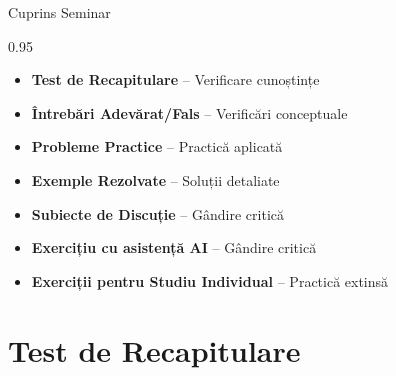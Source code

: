 \documentclass[9pt, aspectratio=169, t]{beamer}
\subtitle{Seminar 7: Cointegrare \& VECM}
\begin{document}
{
\begin{frame}
    \titlepage
\end{frame}
}

\begin{frame}{Cuprins Seminar}
    \begin{cminipage}{0.95\textwidth}
    \begin{itemize}\setlength{\itemsep}{0pt}
        \item \textbf{Test de Recapitulare} -- Verificare cunoștințe
        \vspace{0.15cm}
        \item \textbf{Întrebări Adevărat/Fals} -- Verificări conceptuale
        \vspace{0.15cm}
        \item \textbf{Probleme Practice} -- Practică aplicată
        \vspace{0.15cm}
        \item \textbf{Exemple Rezolvate} -- Soluții detaliate
        \vspace{0.15cm}
        \item \textbf{Subiecte de Discuție} -- Gândire critică
        \vspace{0.15cm}
        \item \textbf{Exercițiu cu asistență AI} -- Gândire critică
        \vspace{0.15cm}
        \item \textbf{Exerciții pentru Studiu Individual} -- Practică extinsă
    \end{itemize}
    \end{cminipage}
\end{frame}


\section{Test de Recapitulare}
\end{document}
